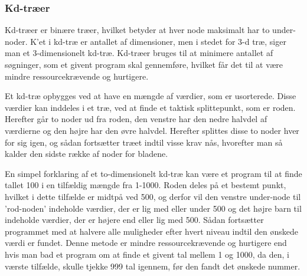 \subsubsection{Kd-træer}
\label{sec:kdtree}

Kd-træer er binære træer, hvilket betyder at hver node maksimalt har to under-noder. K'et i kd-træ er antallet af dimensioner, men i stedet for 3-d træ, siger man et 3-dimensionelt kd-træ. Kd-træer bruges til at minimere antallet af søgninger, som et givent program skal gennemføre, hvilket får det til at være mindre ressourcekrævende og hurtigere. 

Et kd-træ opbygges ved at have en mængde af værdier, som er usorterede. Disse værdier kan inddeles i et træ, ved at finde et taktisk splittepunkt, som er roden. Herefter går to noder ud fra roden, den venstre har den nedre halvdel af værdierne og den højre har den øvre halvdel. Herefter splittes disse to noder hver for sig igen, og sådan fortsætter træet indtil visse krav nås, hvorefter man så kalder den sidste række af noder for bladene. 

En simpel forklaring af et to-dimensionelt kd-træ kan være et program til at finde tallet 100 i en tilfældig mængde fra 1-1000. Roden deles på et bestemt punkt, hvilket i dette tilfælde er midtpå ved 500, og derfor vil den venstre under-node til 'rod-noden' indeholde værdier, der er lig med eller under 500 og det højre barn til indeholde værdier, der er højere end eller lig med 500. Sådan fortsætter programmet med at halvere alle muligheder efter hvert niveau indtil den ønskede værdi er fundet. Denne metode er mindre ressourcekrævende og hurtigere end hvis man bad et program om at finde et givent tal mellem 1 og 1000, da den, i værste tilfælde, skulle tjekke 999 tal igennem, før den fandt det ønskede nummer.